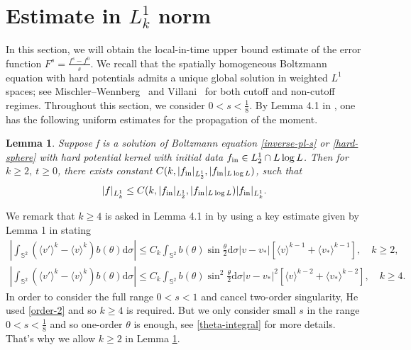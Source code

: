\documentclass[reqno,10pt]{amsart}
\def\th{\theta}
\newcommand{\ben}{\begin{eqnarray}}
\newcommand{\een}{\end{eqnarray}}
\newcommand{\beno}{\begin{eqnarray*}}
\newcommand{\eeno}{\end{eqnarray*}}
\newtheorem{lem}{Lemma}[section]
\theoremstyle{definition}
\numberwithin{equation}{section}
\begin{document}
\section{Estimate in \texorpdfstring{$L^1_k$}{L1k} norm}\label{sec 3}
In this section, we will obtain the local-in-time upper bound estimate of the error function $F^s=\frac{f^s-f^0}{s}$. We recall that the spatially homogeneous Boltzmann equation with hard potentials
admits a unique global solution in weighted $L^1$ spaces; see
Mischler--Wennberg~\cite{MischlerWennberg1999} and Villani~\cite{Villani1998NewClassWeakSol} for both cutoff and non-cutoff regimes.
 Throughout this section, we consider $0<s<\frac{1}{8}$. By Lemma 4.1 in \cite{He2012}, one has the following uniform estimates for the propagation of the moment.
\begin{lem}\label{lem3.1}
    Suppose f is a solution of Boltzmann equation \eqref{inverse-pl-s} or \eqref{hard-sphere} with hard potential kernel with initial data $f_{\textup{in}}\in L^1_2\cap L\log L$. Then for $k\ge 2,\ t\ge 0$, there exists constant $C(k,|f_{\textup{in}}|_{L^1_2},|f_{\textup{in}}|_{L\log L})$, such that
    \beno
|f|_{L^1_k}\le C(k,|f_{\textup{in}}|_{L^1_2},|f_{\textup{in}}|_{L\log L})|f_{\textup{in}}|_{L^1_k}.
    \eeno
\end{lem}

We remark that $k\ge 4$ is asked in Lemma 4.1  in \cite{He2012} by using a key estimate given by Lemma 1 in \cite{Desvillettes2009-ky} stating 
\ben \label{order-1}
	|\int_{\mathbb{S}^2}(\langle v'\rangle^k-\langle v\rangle^k)b(\th)\mathrm{d}\sigma|\le C_k \int_{\mathbb{S}^2}b(\th)\sin\frac{\th}{2}\mathrm{d}\sigma|v-v_*|[\langle v\rangle^{k-1}+\langle v_*\rangle^{k-1}],\quad  k \ge 2,
	\\ \label{order-2}
	|\int_{\mathbb{S}^2}(\langle v'\rangle^k-\langle v\rangle^k)b(\th)\mathrm{d}\sigma|\le C_k \int_{\mathbb{S}^2}b(\th)\sin^2\frac{\th}{2}\mathrm{d}\sigma|v-v_*|^2[\langle v\rangle^{k-2}+\langle v_*\rangle^{k-2}],\quad k \ge 4.
\een
In order to consider the full range $0<s<1$ and cancel two-order singularity, He \cite{He2012} used 
\eqref{order-2} and so $k\ge 4$ is required. But we only consider small $s$ in the range $0<s<\frac{1}{8}$ and so one-order $\theta$ is enough, see \eqref{theta-integral} for more details. 
That's why we allow $k \geq 2$ in Lemma \ref{lem3.1}. 
\end{document}
